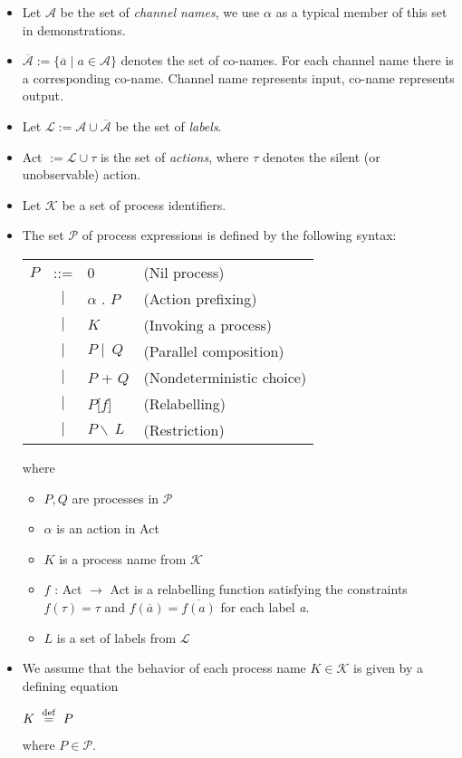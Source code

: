 \begin{itemize}
		\item Let $\mathcal{A}$ be the set of \textit{channel names}, we use 
		$\alpha$ as a typical member of this set in demonstrations.
	
		\item $\overline{\mathcal{A}} := \{\overline{a}\mid a \in \mathcal{A}\}$
		denotes the set of co-names. For each channel name there is a
		corresponding co-name. Channel name represents input, co-name represents 
		output.
	
		\item Let $\mathcal{L} := \mathcal{A} \cup \overline{\mathcal{A}}$ be the 
		set of \textit{labels}.
		
		\item \textsf{Act} $:= \mathcal{L} \cup {\tau}$ is the set of 
		\textit{actions}, where $\tau$ denotes the silent (or unobservable) action.
		
		\item Let $\mathcal{K}$ be a set of process identifiers.
		
		\item The set $\mathcal{P}$ of process expressions is defined by the 
		following syntax:

		\begin{tabular}{r c l l}
			$P$ & ::= & 0 & (Nil process)\\
			    & $\mid$ & $\alpha$ . $P$ & (Action prefixing) \\
			    & $\mid$ & $K$ & (Invoking a process)\\
			    & $\mid$ & $P \mid\ Q$ & (Parallel composition)\\
			    & $\mid$ & $P$ + $Q$ & (Nondeterministic choice)\\
			    & $\mid$ & $P$[$f$] & (Relabelling)\\
			    & $\mid$ & $P \backslash\ L$ & (Restriction)
		\end{tabular}
		
		where 
		
		\begin{itemize}
			\item $P,Q$ are processes in $\mathcal{P}$
			\item $\alpha$ is an action in \textsf{Act}
			\item $K$ is a process name from $\mathcal{K}$
			\item $f$ : \textsf{Act} $\rightarrow$ \textsf{Act} is a relabelling 
			function satisfying the constraints $f(\tau) = \tau$ and 
			$f(\overline{a}) = \overline{f(a)}$ for each label \textit{a}.
			\item $L$ is a set of labels from $\mathcal{L}$
		\end{itemize} 
		
		\item We assume that the behavior of each process name $K \in \mathcal{K}$ 
		is given by a defining equation
		
		\begin{center}$K \ \stackrel{\mathrm{def}}{=}\  P$\end{center}
		
		where $P \in \mathcal{P}$.

	\end{itemize}
